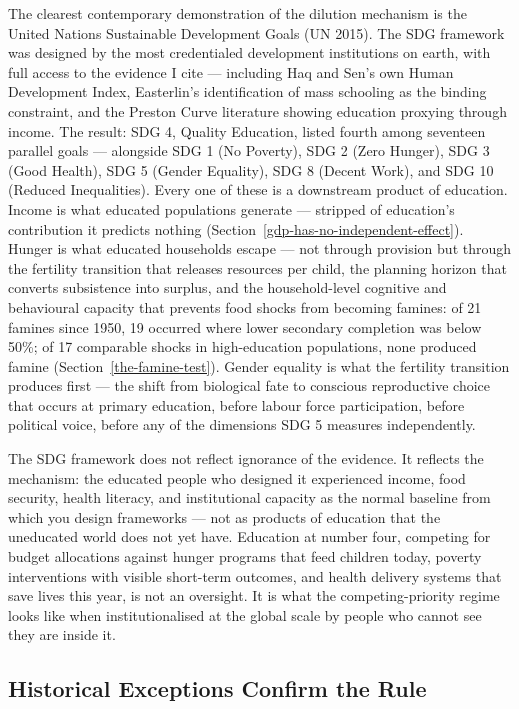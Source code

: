 \documentclass[12pt,letterpaper]{article}
\begin{document}
The clearest contemporary demonstration of the dilution mechanism is
the United Nations Sustainable Development Goals (UN 2015). The SDG
framework was designed by the most credentialed development
institutions on earth, with full access to the evidence I
cite --- including Haq and Sen's own Human Development Index,
Easterlin's identification of mass schooling as the binding
constraint, and the Preston Curve literature showing education
proxying through income. The result: SDG 4, Quality Education, listed
fourth among seventeen parallel goals --- alongside SDG 1 (No
Poverty), SDG 2 (Zero Hunger), SDG 3 (Good Health), SDG 5 (Gender
Equality), SDG 8 (Decent Work), and SDG 10 (Reduced Inequalities).
Every one of these is a downstream product of education.
Income is what educated populations generate --- stripped of education's
contribution it predicts nothing
(Section~\ref{gdp-has-no-independent-effect}). Hunger is what educated
households escape --- not through provision but through the fertility
transition that releases resources per child, the planning horizon that
converts subsistence into surplus, and the household-level cognitive and
behavioural capacity that prevents food shocks from becoming famines:
of 21 famines since 1950, 19 occurred where lower secondary completion
was below 50\%; of 17 comparable shocks in high-education populations,
none produced famine (Section~\ref{the-famine-test}). Gender equality
is what the fertility transition produces first --- the shift from
biological fate to conscious reproductive choice that occurs at primary
education, before labour force participation, before political voice,
before any of the dimensions SDG 5 measures independently.

The SDG framework does not reflect ignorance of the evidence. It reflects the
mechanism: the educated people who designed it experienced income, food
security, health literacy, and institutional capacity as the normal
baseline from which you design frameworks --- not as products of
education that the uneducated world does not yet have. Education at
number four, competing for budget allocations against hunger programs
that feed children today, poverty interventions with visible short-term
outcomes, and health delivery systems that save lives this year, is not
an oversight. It is what the competing-priority regime looks like when
institutionalised at the global scale by people who cannot see they are
inside it.

\subsection{Historical Exceptions Confirm the Rule}\label{historical-exceptions-confirm-the-rule}
\end{document}
